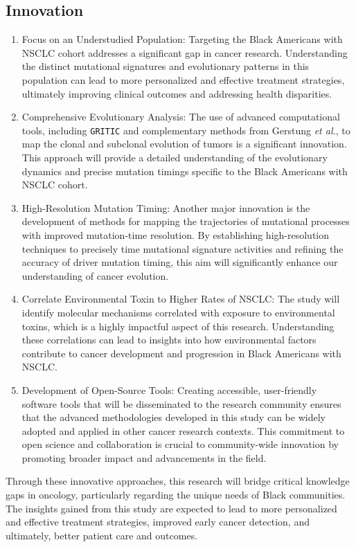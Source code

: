 \subsection*{Innovation}

\begin{enumerate}

\item{Focus on an Understudied Population: 
Targeting the Black Americans with NSCLC cohort addresses a significant gap in cancer research. 
Understanding the distinct mutational signatures and evolutionary patterns in this population 
can lead to more personalized and effective treatment strategies, 
ultimately improving clinical outcomes and addressing health disparities.}
\item Comprehensive Evolutionary Analysis: 
The use of advanced computational tools, including \texttt{GRITIC} and complementary methods from Gerstung \textit{et al.}, 
to map the clonal and subclonal evolution of tumors is a significant innovation. 
This approach will provide a detailed understanding of the evolutionary dynamics and 
precise mutation timings specific to the Black Americans with NSCLC cohort.
\item High-Resolution Mutation Timing: 
Another major innovation is the development of methods for mapping the trajectories of mutational processes with improved mutation-time resolution. 
By establishing high-resolution techniques to precisely time mutational signature activities and refining the accuracy of driver mutation timing, 
this aim will significantly enhance our understanding of cancer evolution.
\item Correlate Environmental Toxin to Higher Rates of NSCLC: 
The study will identify molecular mechanisms correlated with exposure to environmental toxins, which is a highly impactful aspect of this research. 
Understanding these correlations can lead to insights into how environmental factors contribute to cancer development and progression in Black Americans with NSCLC.
\item Development of Open-Source Tools: 
Creating accessible, user-friendly software tools that will be disseminated to the research community 
ensures that the advanced methodologies developed in this study can be widely adopted and applied in other cancer research contexts. 
This commitment to open science and collaboration is crucial to community-wide innovation by promoting broader impact and advancements in the field.

\end{enumerate}

\vspace{1em}
\noindent
Through these innovative approaches, this research will bridge critical knowledge gaps 
in oncology, particularly regarding the unique needs of Black communities. 
The insights gained from this study are expected to lead to more personalized and 
effective treatment strategies, improved early cancer detection, and ultimately, better patient care and outcomes.
